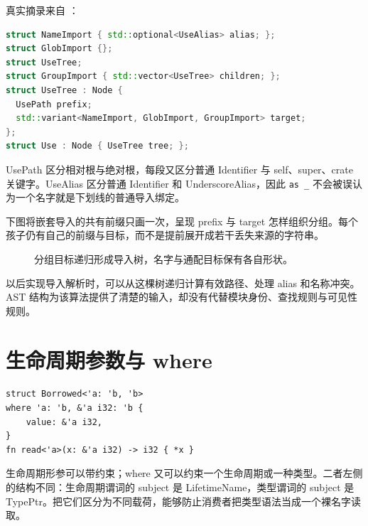 真实摘录来自 ：
\begin{lstlisting}[language=C++]
struct NameImport { std::optional<UseAlias> alias; };
struct GlobImport {};
struct UseTree;
struct GroupImport { std::vector<UseTree> children; };
struct UseTree : Node {
  UsePath prefix;
  std::variant<NameImport, GlobImport, GroupImport> target;
};
struct Use : Node { UseTree tree; };
\end{lstlisting}
UsePath 区分相对根与绝对根，每段又区分普通 Identifier 与 self、super、crate 关键字。UseAlias 区分普通 Identifier 和 UnderscoreAlias，因此 \texttt{as \_} 不会被误认为一个名字就是下划线的普通导入绑定。

下图将嵌套导入的共有前缀只画一次，呈现 prefix 与 target 怎样组织分组。每个孩子仍有自己的前缀与目标，而不是提前展开成若干丢失来源的字符串。
\begin{figure}[htbp]
\centering
{}
\caption{分组目标递归形成导入树，名字与通配目标保有各自形状。}
\end{figure}
以后实现导入解析时，可以从这棵树递归计算有效路径、处理 alias 和名称冲突。AST 结构为该算法提供了清楚的输入，却没有代替模块身份、查找规则与可见性规则。

\section{生命周期参数与 where}
\begin{lstlisting}[language=Rustless]
struct Borrowed<'a: 'b, 'b>
where 'a: 'b, &'a i32: 'b {
    value: &'a i32,
}
fn read<'a>(x: &'a i32) -> i32 { *x }
\end{lstlisting}
生命周期形参可以带约束；where 又可以约束一个生命周期或一种类型。二者左侧的结构不同：生命周期谓词的 subject 是 LifetimeName，类型谓词的 subject 是 TypePtr。把它们区分为不同载荷，能够防止消费者把类型语法当成一个裸名字读取。

